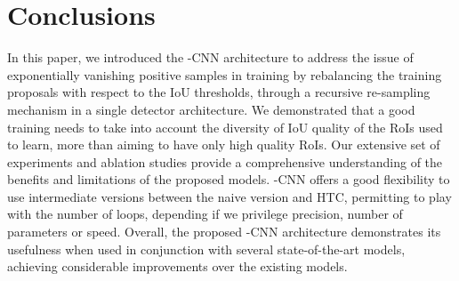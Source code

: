 \documentclass[runningheads, orivec]{llncs}
\begin{document}
  \section{Conclusions}
\label{sec:conclusion}

In this paper, we introduced the -CNN architecture to address the issue of exponentially vanishing positive samples in training by rebalancing the training proposals with respect to the IoU thresholds, through a recursive re-sampling mechanism in a single detector architecture.
We demonstrated that a good training needs to take into account the diversity of IoU quality of the RoIs used to learn, more than aiming to have only high quality RoIs.
Our extensive set of experiments and ablation studies provide a comprehensive understanding of the benefits and limitations of the proposed models.
-CNN offers a good flexibility to use intermediate versions between the naive version and HTC, permitting to play with the number of loops, depending if we privilege precision, number of parameters or speed.
Overall, the proposed -CNN architecture demonstrates its usefulness when used in conjunction with several state-of-the-art models, achieving considerable improvements over the existing models.
 

 
\end{document}
